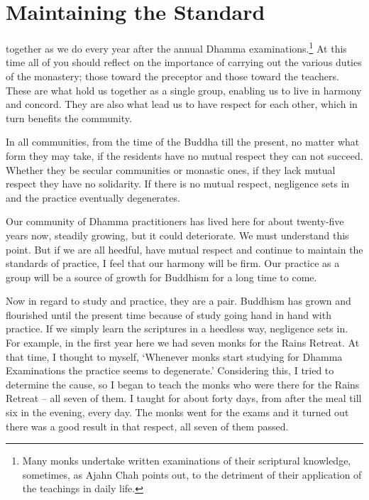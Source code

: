
\chapter{Maintaining the Standard}

 together as we do every year after the annual Dhamma examinations.\footnote{Many monks undertake written examinations of their scriptural knowledge, sometimes, as Ajahn Chah points out, to the detriment of their application of the teachings in daily life.} At this time all of you should reflect on the importance of carrying out the various duties of the monastery; those toward the preceptor and those toward the teachers. These are what hold us together as a single group, enabling us to live in harmony and concord. They are also what lead us to have respect for each other, which in turn benefits the community.

In all communities, from the time of the Buddha till the present, no matter what form they may take, if the residents have no mutual respect they can not succeed. Whether they be secular communities or monastic ones, if they lack mutual respect they have no solidarity. If there is no mutual respect, negligence sets in and the practice eventually degenerates.

Our community of Dhamma practitioners has lived here for about twenty-five years now, steadily growing, but it could deteriorate. We must understand this point. But if we are all heedful, have mutual respect and continue to maintain the standards of practice, I feel that our harmony will be firm. Our practice as a group will be a source of growth for Buddhism for a long time to come.

Now in regard to study and practice, they are a pair. Buddhism has grown and flourished until the present time because of study going hand in hand with practice. If we simply learn the scriptures in a heedless way, negligence sets in.
For example, in the first year here we had seven monks for the Rains Retreat. At that time, I thought to myself, `Whenever monks start studying for Dhamma Examinations the practice seems to degenerate.' Considering this, I tried to determine the cause, so I began to teach the monks who were there for the Rains Retreat -- all seven of them. I taught for about forty days, from after the meal till six in the evening, every day. The monks went for the exams and it turned out there was a good result in that respect, all seven of them passed.

